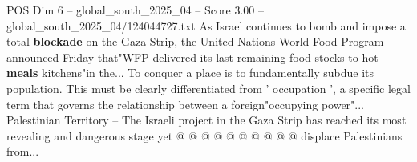 \begin{textsample}{POS Dim 6 – global\_south\_2025\_04 – Score 3.00 – global\_south\_2025\_04/124044727.txt}
As Israel continues to bomb and impose a total \textbf{blockade} on the Gaza Strip, the United Nations World Food Program announced Friday that"WFP delivered its last remaining food stocks to hot \textbf{meals} kitchens"in the...
To conquer a place is to fundamentally subdue its population.
This must be clearly differentiated from ' occupation ', a specific legal term that governs the relationship between a foreign"occupying power"...
Palestinian Territory -- The Israeli project in the Gaza Strip has reached its most revealing and dangerous stage yet @ @ @ @ @ @ @ @ @ @ displace Palestinians from...

\end{textsample}
